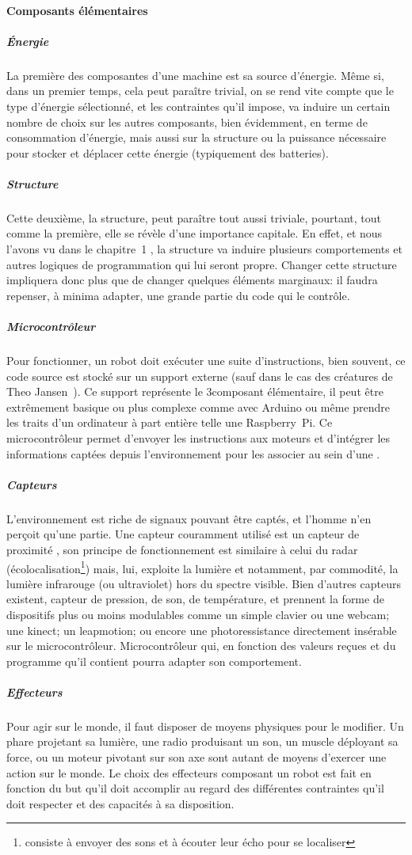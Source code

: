         \paragraph{Composants élémentaires}\label{sec:5compo}
            \subparagraph{Énergie} 
                La première des composantes d'une machine est sa source d'énergie. Même si, dans un premier temps, cela peut paraître trivial, on se rend vite compte que le type d'énergie sélectionné, et les contraintes qu'il impose, va induire un certain nombre de choix sur les autres composants, bien évidemment, en terme de consommation d'énergie, mais aussi sur la structure ou la puissance nécessaire pour stocker et déplacer cette énergie (typiquement des batteries).
            \subparagraph{Structure}
                Cette deuxième, la structure, peut paraître tout aussi triviale, pourtant, tout comme la première, elle se révèle d'une importance capitale. En effet, et nous l'avons vu dans le chapitre~1 , la structure va induire plusieurs comportements et autres logiques de programmation qui lui seront propre. Changer cette structure impliquera donc plus que de changer quelques éléments marginaux: il faudra repenser, à minima adapter, une grande partie du code qui le contrôle.
            \subparagraph{Microcontrôleur}
                Pour fonctionner, un robot doit exécuter une suite d'instructions, bien souvent, ce code source est stocké sur un support externe (sauf dans le cas des créatures de Theo Jansen~). Ce support représente le 3\ieme composant élémentaire, il peut être extrêmement basique ou plus complexe comme avec Arduino ou même prendre les traits d'un ordinateur à part entière telle une Raspberry~Pi. Ce microcontrôleur permet d'envoyer les instructions aux moteurs et d'intégrer les informations captées depuis l'environnement pour les associer au sein d'une .
            \subparagraph{Capteurs}
                L'environnement est riche de signaux pouvant être captés, et l'homme n'en perçoit qu'une partie. Une capteur couramment utilisé est un capteur de proximité , son principe de fonctionnement est similaire à celui du radar (écolocalisation\footnote{consiste à envoyer des sons et à écouter leur écho pour se localiser}) mais, lui, exploite la lumière et notamment, par commodité, la lumière infrarouge (ou ultraviolet) hors du spectre visible. Bien d'autres capteurs existent, capteur de pression, de son, de température, \etc et prennent la forme de dispositifs plus ou moins modulables comme un simple clavier ou une webcam; une kinect; un leapmotion; ou encore une photoressistance directement insérable sur le microcontrôleur. Microcontrôleur qui, en fonction des valeurs reçues et du programme qu'il contient pourra adapter son comportement.
            \subparagraph{Effecteurs}
                Pour agir sur le monde, il faut disposer de moyens physiques pour le modifier. Un phare projetant sa lumière, une radio produisant un son, un muscle déployant sa force, ou un moteur pivotant sur son axe sont autant de moyens d'exercer une action sur le monde. Le choix des effecteurs composant un robot est fait en fonction du but qu'il doit accomplir au regard des différentes contraintes qu'il doit respecter et des capacités à sa disposition.
